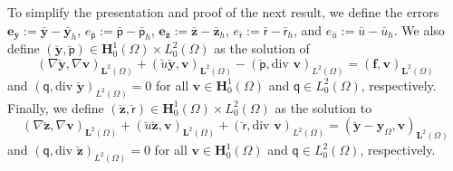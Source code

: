 \documentclass[final]{siamart0216}
\begin{document}
To simplify the presentation and proof of the next result, we define the errors $\mathbf{e}_{\bar{\mathbf{y}}}:=\bar{\mathbf{y}}-\bar{\mathbf{y}}_{h}$, $e_{\bar{\mathsf{p}}}:=\bar{\mathsf{p}}-\bar{\mathsf{p}}_{h}$, $\mathbf{e}_{\bar{\mathbf{z}}}:=\bar{\mathbf{z}}-\bar{\mathbf{z}}_{h}$, $e_{\bar{\mathsf{r}}}:=\bar{\mathsf{r}}-\bar{\mathsf{r}}_{h}$, and $e_{\bar{u}}:=\bar{u}-\bar{u}_{h}$. We also define $(\breve{\mathbf{y}},\breve{\mathsf{p}})\in \mathbf{H}_0^1(\Omega)\times L_0^2(\Omega)$ as the solution of
\begin{equation}\label{eq:brinkamn_problem_state_auxA}
(\nabla \breve{\mathbf{y}},\nabla \mathbf{v})_{\mathbf{L}^2(\Omega)}+( \breve{u}\breve{\mathbf{y}}, \mathbf{v})_{\mathbf{L}^2(\Omega)}-(\breve{\mathsf{p}},\text{div }\mathbf{v})_{L^2(\Omega)} =(\mathbf{f},\mathbf{v})_{\mathbf{L}^2(\Omega)}
\end{equation}
and $(\mathsf{q},\text{div }\breve{\mathbf{y}})_{L^2(\Omega)}  = 0$ for all $\mathbf{v} \in \mathbf{H}_0^1(\Omega)$ and $\mathsf{q}\in L_0^2(\Omega)$, respectively. Finally, we define
$(\breve{\mathbf{z}},\breve{\mathsf{r}})\in\mathbf{H}_0^1(\Omega)\times L_0^2(\Omega)$ as the solution to
\begin{equation}\label{eq:brinkamn_problem_adjoint_auxA}
(\nabla \breve{\mathbf{z}},\nabla \mathbf{v})_{\mathbf{L}^2(\Omega)}+( \breve{u}\breve{\mathbf{z}}, \mathbf{v})_{\mathbf{L}^2(\Omega)}+(\breve{\mathsf{r}},\text{div }\mathbf{v})_{L^2(\Omega)} = 	(\breve{\mathbf{y}}-\mathbf{y}_{\Omega},\mathbf{v})_{\mathbf{L}^2(\Omega)}
\end{equation}
and $(\mathsf{q},\text{div }\breve{\mathbf{z}})_{L^2(\Omega)}  = 0$ for all $\mathbf{v} \in \mathbf{H}_0^1(\Omega)$ and $\mathsf{q} \in L_0^2(\Omega)$, respectively.
\end{document}
